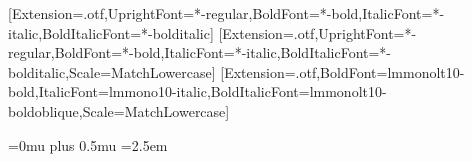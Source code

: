 \usepackage{fontspec}
\setmainfont{texgyrepagella}[Extension=.otf,UprightFont=*-regular,BoldFont=*-bold,ItalicFont=*-italic,BoldItalicFont=*-bolditalic]
\setsansfont{texgyreheros}[Extension=.otf,UprightFont=*-regular,BoldFont=*-bold,ItalicFont=*-italic,BoldItalicFont=*-bolditalic,Scale=MatchLowercase]
\setmonofont{lmmono10-regular}[Extension=.otf,BoldFont=lmmonolt10-bold,ItalicFont=lmmono10-italic,BoldItalicFont=lmmonolt10-boldoblique,Scale=MatchLowercase]
\usepackage[indonesian]{babel}
\usepackage[a4paper,margin=2.4cm,headheight=14pt]{geometry}
\usepackage{microtype}
\usepackage{setspace}
\usepackage{parskip}
\setlength{\parskip}{0.55em}
\usepackage{xcolor}
\usepackage{booktabs,tabularx,array,longtable,multirow}
\usepackage{enumitem}
\usepackage{url}
\makeatletter
\g@addto@macro\UrlBreaks{\do\_\do\=\do\:\do\,}
\g@addto@macro\UrlBigBreaks{\do\_\do\[\do\]\do\(\do\)}
\makeatother
\Urlmuskip=0mu plus 0.5mu
\emergencystretch=2.5em
\usepackage{listings}
\usepackage{tikz}
\usetikzlibrary{positioning,fit,backgrounds,arrows.meta,shapes.geometric,calc}
\usepackage[most]{tcolorbox}
\usepackage{fancyhdr}
\usepackage{titlesec}
\usepackage{caption}
\usepackage[hidelinks]{hyperref}

\color{ink}

\titleformat{\chapter}[hang]{\sffamily\bfseries\huge\color{accent}}{\thechapter}{0.6em}{}
\titlespacing*{\chapter}{0pt}{-10pt}{22pt}
\titleformat{\section}{\sffamily\bfseries\Large\color{accent}}{\thesection}{0.6em}{}
\titleformat{\subsection}{\sffamily\bfseries\large\color{ink}}{\thesubsection}{0.6em}{}
\titleformat{\subsubsection}{\sffamily\bfseries\normalsize\color{ink}}{}{0em}{}
\titlespacing*{\section}{0pt}{1.6em}{0.5em}
\titlespacing*{\subsection}{0pt}{1.2em}{0.4em}

